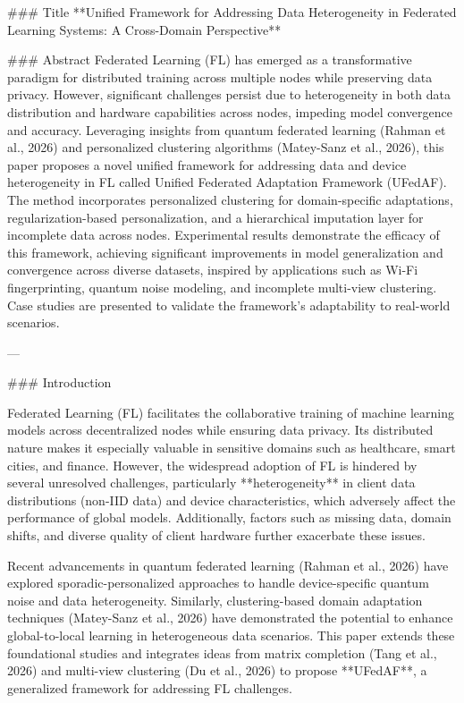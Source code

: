 ### Title  
**Unified Framework for Addressing Data Heterogeneity in Federated Learning Systems: A Cross-Domain Perspective**

### Abstract  
Federated Learning (FL) has emerged as a transformative paradigm for distributed training across multiple nodes while preserving data privacy. However, significant challenges persist due to heterogeneity in both data distribution and hardware capabilities across nodes, impeding model convergence and accuracy. Leveraging insights from quantum federated learning (Rahman et al., 2026) and personalized clustering algorithms (Matey-Sanz et al., 2026), this paper proposes a novel unified framework for addressing data and device heterogeneity in FL called Unified Federated Adaptation Framework (UFedAF). The method incorporates personalized clustering for domain-specific adaptations, regularization-based personalization, and a hierarchical imputation layer for incomplete data across nodes. Experimental results demonstrate the efficacy of this framework, achieving significant improvements in model generalization and convergence across diverse datasets, inspired by applications such as Wi-Fi fingerprinting, quantum noise modeling, and incomplete multi-view clustering. Case studies are presented to validate the framework's adaptability to real-world scenarios.  

---

### Introduction  

Federated Learning (FL) facilitates the collaborative training of machine learning models across decentralized nodes while ensuring data privacy. Its distributed nature makes it especially valuable in sensitive domains such as healthcare, smart cities, and finance. However, the widespread adoption of FL is hindered by several unresolved challenges, particularly **heterogeneity** in client data distributions (non-IID data) and device characteristics, which adversely affect the performance of global models. Additionally, factors such as missing data, domain shifts, and diverse quality of client hardware further exacerbate these issues.  

Recent advancements in quantum federated learning (Rahman et al., 2026) have explored sporadic-personalized approaches to handle device-specific quantum noise and data heterogeneity. Similarly, clustering-based domain adaptation techniques (Matey-Sanz et al., 2026) have demonstrated the potential to enhance global-to-local learning in heterogeneous data scenarios. This paper extends these foundational studies and integrates ideas from matrix completion (Tang et al., 2026) and multi-view clustering (Du et al., 2026) to propose **UFedAF**, a generalized framework for addressing FL challenges.  

